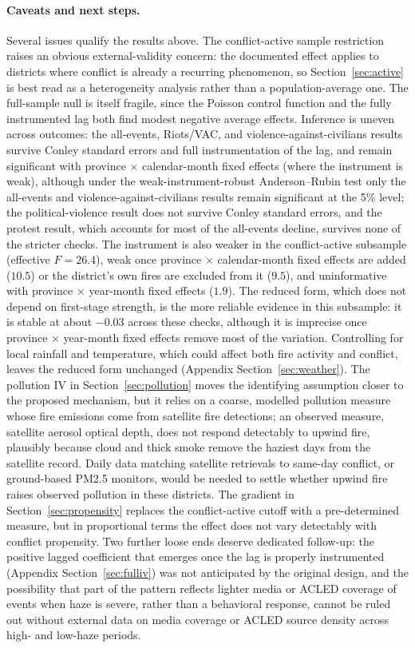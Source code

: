 \documentclass[12pt]{article}
\begin{document}
\paragraph{Caveats and next steps.} Several issues qualify the results above. The conflict-active sample restriction raises an obvious external-validity concern: the documented effect applies to districts where conflict is already a recurring phenomenon, so Section~\ref{sec:active} is best read as a heterogeneity analysis rather than a population-average one. The full-sample null is itself fragile, since the Poisson control function and the fully instrumented lag both find modest negative average effects. Inference is uneven across outcomes: the all-events, Riots/VAC, and violence-against-civilians results survive Conley standard errors and full instrumentation of the lag, and remain significant with province $\times$ calendar-month fixed effects (where the instrument is weak), although under the weak-instrument-robust Anderson--Rubin test only the all-events and violence-against-civilians results remain significant at the 5\% level; the political-violence result does not survive Conley standard errors, and the protest result, which accounts for most of the all-events decline, survives none of the stricter checks. The instrument is also weaker in the conflict-active subsample (effective $F = 26.4$), weak once province $\times$ calendar-month fixed effects are added ($10.5$) or the district's own fires are excluded from it ($9.5$), and uninformative with province $\times$ year-month fixed effects ($1.9$). The reduced form, which does not depend on first-stage strength, is the more reliable evidence in this subsample: it is stable at about $-0.03$ across these checks, although it is imprecise once province $\times$ year-month fixed effects remove most of the variation. Controlling for local rainfall and temperature, which could affect both fire activity and conflict, leaves the reduced form unchanged (Appendix Section~\ref{sec:weather}). The pollution IV in Section~\ref{sec:pollution} moves the identifying assumption closer to the proposed mechanism, but it relies on a coarse, modelled pollution measure whose fire emissions come from satellite fire detections; an observed measure, satellite aerosol optical depth, does not respond detectably to upwind fire, plausibly because cloud and thick smoke remove the haziest days from the satellite record. Daily data matching satellite retrievals to same-day conflict, or ground-based PM2.5 monitors, would be needed to settle whether upwind fire raises observed pollution in these districts. The gradient in Section~\ref{sec:propensity} replaces the conflict-active cutoff with a pre-determined measure, but in proportional terms the effect does not vary detectably with conflict propensity. Two further loose ends deserve dedicated follow-up: the positive lagged coefficient that emerges once the lag is properly instrumented (Appendix Section~\ref{sec:fulliv}) was not anticipated by the original design, and the possibility that part of the pattern reflects lighter media or ACLED coverage of events when haze is severe, rather than a behavioral response, cannot be ruled out without external data on media coverage or ACLED source density across high- and low-haze periods.
\end{document}
